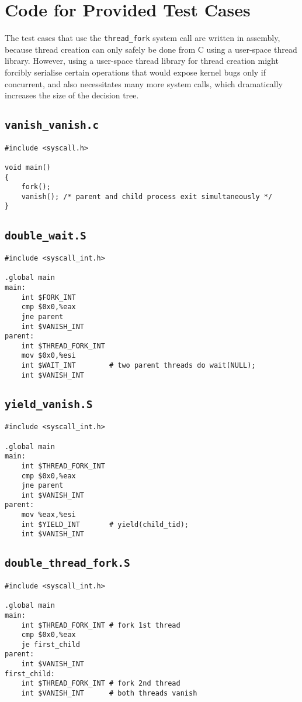 \chapter{Code for Provided Test Cases}
\label{sec:test-code}

The test cases that use the \texttt{thread\_fork} system call are written in assembly, because thread creation can only safely be done from C using a user-space thread library. However, using a user-space thread library for thread creation might forcibly serialise certain operations that would expose kernel bugs only if concurrent, and also necessitates many more system calls, which dramatically increases the size of the decision tree.

\section{\texttt{vanish\_vanish.c}}
%
{\small
\begin{verbatim}
#include <syscall.h>

void main()
{
    fork();
    vanish(); /* parent and child process exit simultaneously */
}
\end{verbatim}
}
\section{\texttt{double\_wait.S}}
{\small
\begin{verbatim}
#include <syscall_int.h>

.global main
main:
    int $FORK_INT
    cmp $0x0,%eax
    jne parent
    int $VANISH_INT
parent:
    int $THREAD_FORK_INT
    mov $0x0,%esi
    int $WAIT_INT        # two parent threads do wait(NULL);
    int $VANISH_INT
\end{verbatim}
}
\section{\texttt{yield\_vanish.S}}
{\small
\begin{verbatim}
#include <syscall_int.h>

.global main
main:
    int $THREAD_FORK_INT
    cmp $0x0,%eax
    jne parent
    int $VANISH_INT
parent:
    mov %eax,%esi
    int $YIELD_INT       # yield(child_tid);
    int $VANISH_INT
\end{verbatim}
}
\section{\texttt{double\_thread\_fork.S}}
{\small
\begin{verbatim}
#include <syscall_int.h>

.global main
main:
    int $THREAD_FORK_INT # fork 1st thread
    cmp $0x0,%eax
    je first_child
parent:
    int $VANISH_INT
first_child:
    int $THREAD_FORK_INT # fork 2nd thread
    int $VANISH_INT      # both threads vanish
\end{verbatim}
}
